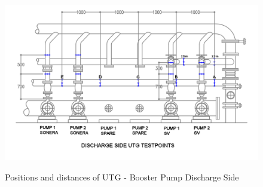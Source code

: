 \begin{figure}[!htb]
\includegraphics[scale=0.3]{figures/ch04_fig_utgsp} \\
\caption{Positions and distances of UTG - Booster Pump Discharge Side}
\label{ch04_fig_utgsp} 
\end{figure}


%			


